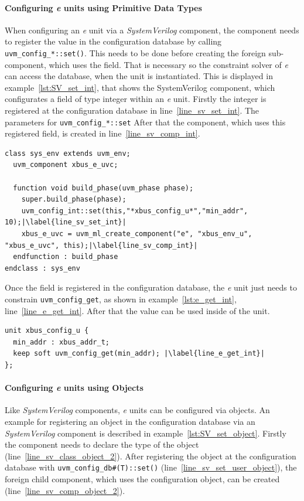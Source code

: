 \paragraph{Configuring \textit{e} units using Primitive Data Types}
When configuring an \textit{e} unit via a \emph{SystemVerilog} component, the component needs to register the value in
the configuration database by calling \lstinline$uvm_config_*::set()$. This needs to be
done before creating the foreign sub-component, which uses the field. That is necessary so the constraint solver of
\textit{e} can access the database, when the unit is instantiated. This is displayed in example~\ref{lst:SV_set_int},
that shows the SystemVerilog component, which configurates a field of type integer within an \textit{e} unit. Firstly
the integer is registered at the configuration database in line~\ref{line_sv_set_int}. The parameters for
\lstinline$uvm_config_*::set$ After that the component, which uses this registered field, is created in
line~\ref{line_sv_comp_int}.

\lstset{language=SystemVerilog, numbers = left, escapechar=|, breaklines=true}
\begin{lstlisting}[frame=htrbl, caption={SystemVerilog: register an integer in configuration database},
label={lst:SV_set_int}]
class sys_env extends uvm_env;
  uvm_component xbus_e_uvc;
  
  function void build_phase(uvm_phase phase);
    super.build_phase(phase);
    uvm_config_int::set(this,"*xbus_config_u*","min_addr", 10);|\label{line_sv_set_int}|
    xbus_e_uvc = uvm_ml_create_component("e", "xbus_env_u", "xbus_e_uvc", this);|\label{line_sv_comp_int}|
  endfunction : build_phase
endclass : sys_env
\end{lstlisting}

Once the field is registered in the configuration database, the \textit{e} unit just needs to constrain
\lstinline$uvm_config_get$, as shown in example~\ref{lst:e_get_int}, line~\ref{line_e_get_int}. After that the value can
be used inside of the unit.

\lstset{language=e, numbers = left, escapechar=|, breaklines=true}
\begin{lstlisting}[frame=htrbl, caption={e: getting an integer from configuration database}, label={lst:e_get_int}]
unit xbus_config_u {
  min_addr : xbus_addr_t;
  keep soft uvm_config_get(min_addr); |\label{line_e_get_int}|
};
\end{lstlisting}
\paragraph{Configuring \textit{e} units using Objects}
Like \emph{SystemVerilog} components, \textit{e} units can be configured via objects. An example for registering an
object in the configuration database via an \emph{SystemVerilog} component is described in
example~\ref{lst:SV_set_object}. Firstly the component needs to declare the type of the object
(line~\ref{line_sv_class_object_2}). After registering the object at the configuration database with
\lstinline$uvm_config_db#(T)::set()$ (line~\ref{line_sv_set_user_object}), the foreign child component, which uses the
configuration object, can be created (line~\ref{line_sv_comp_object_2}).

